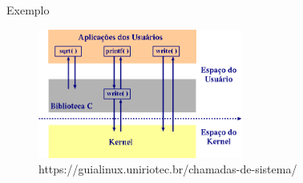 \documentclass{beamer}
\begin{document}
\begin{frame}{Exemplo}\justifying
      \begin{figure}[H]
            \centerline{\includegraphics[width=0.6\textwidth]{assets/aula-tads-sopa2-2023-06-05/chamadas.png}}
            \caption{https://guialinux.uniriotec.br/chamadas-de-sistema/}
        \end{figure}
\end{frame}



\footlinecolor{}

\backmatter
\end{document}
